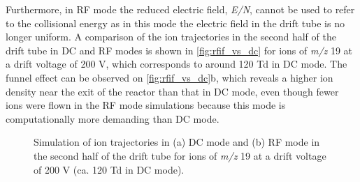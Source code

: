 Furthermore, in RF mode the reduced electric field, \textit{E/N}, cannot be used to refer to the collisional energy as in this mode the electric field  in the drift tube is no longer uniform. A comparison of the ion trajectories  in the second half of the drift tube in DC and RF modes is shown in \autoref{fig:rfif_vs_dc} for ions of \textit{m/z} 19 at a drift voltage of 200 V, which corresponds to around 120 Td in DC mode. The funnel effect can be observed on \autoref{fig:rfif_vs_dc}b, which reveals a higher ion density near the exit of the reactor than that in DC mode, even though fewer ions were flown in the RF mode simulations %
because this mode is computationally more demanding than DC mode.
%
\begin{figure}[t]
\centering
{}
\caption{Simulation of ion trajectories in (a) DC mode and (b) RF mode in the second half of the drift tube for ions of \textit{m/z} 19 at a drift voltage of 200 V (ca. 120 Td in DC mode).}
\label{fig:rfif_vs_dc}
\end{figure}


